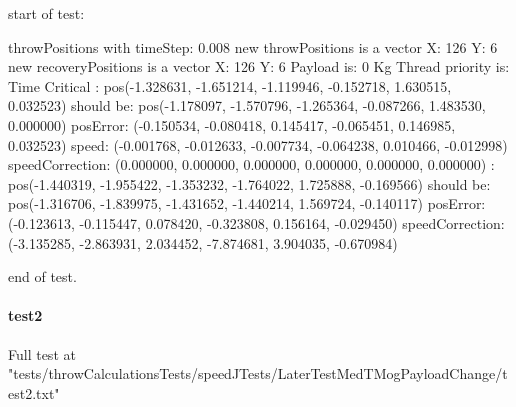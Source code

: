 start of test: \newline 

throwPositions with timeStep:  0.008
\newline new throwPositions is a vector X: 126 Y:  6
\newline new recoveryPositions is a vector X: 126 Y:  6
\newline Payload is:  0  Kg
\newline Thread priority is: Time Critical
\newline [0.000000s - Step 0/126]:
\newline \hspace{1cm}        pos(-1.328631, -1.651214, -1.119946, -0.152718, 1.630515, 0.032523) should be:
\newline \hspace{1cm}        pos(-1.178097, -1.570796, -1.265364, -0.087266, 1.483530, 0.000000)
\newline \hspace{1cm}        posError: (-0.150534, -0.080418, 0.145417, -0.065451, 0.146985, 0.032523)
\newline \hspace{1cm}        speed: (-0.001768, -0.012633, -0.007734, -0.064238, 0.010466, -0.012998)
\newline \hspace{1cm}        speedCorrection: (0.000000, 0.000000, 0.000000, 0.000000, 0.000000, 0.000000)
\newline [1.000000s - Step 125/126]:
\newline \hspace{1cm}        pos(-1.440319, -1.955422, -1.353232, -1.764022, 1.725888, -0.169566) should be:
\newline \hspace{1cm}        pos(-1.316706, -1.839975, -1.431652, -1.440214, 1.569724, -0.140117)
\newline \hspace{1cm}        posError: (-0.123613, -0.115447, 0.078420, -0.323808, 0.156164, -0.029450)
\newline \hspace{1cm}        speedCorrection: (-3.135285, -2.863931, 2.034452, -7.874681, 3.904035, -0.670984)

end of test.\newline 

\paragraph{test2}
Full test at "tests/throwCalculationsTests/speedJTests/LaterTestMedTMogPayloadChange/test2.txt"


